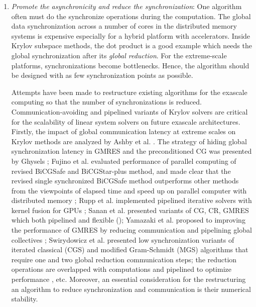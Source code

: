 {\begin{enumerate}[label=(\arabic*)]
    \item \textit{Promote the asynchronicity and reduce the synchronization}: One algorithm often must do the synchronize operations during the computation. The global data synchronization across a number of cores in the distributed memory systems is expensive especially for a hybrid platform with accelerators. Inside Krylov subspace methods, the dot product is a good example which needs the global synchronization after its \textit{global reduction}. For the extreme-scale platforms, synchronizations become bottlenecks. Hence, the algorithm should be designed with as few synchronization points as possible.
	
    Attempts have been made to restructure existing algorithms for the exascale computing so that the number of synchronizations is reduced. Communication-avoiding and pipelined variants of Krylov solvers are critical for the scalability of linear system solvers on future exascale architectures. Firstly, the impact of global communication latency at extreme scales on Krylov methods are analyzed by Ashby et al. \cite{ashby2012impact}. The strategy of hiding global synchronization latency in GMRES and the preconditioned CG was presented by Ghysels \cite{ghysels2013hiding,ghysels2014hiding}; Fujino et al. evaluated performance of parallel computing of revised BiCGSafe and BiCGStar-plus method, and made clear that the revised single synchronized BiCGSafe method outperforms other methods from the viewpoints of elapsed time and speed up on parallel computer with distributed memory \cite{fujino2015estimation}; Rupp et al. implemented pipelined iterative solvers with kernel fusion for GPUs \cite{rupp2016pipelined}; Sanan et al. presented variants of CG, CR, GMRES which both pipelined and flexible (\cite{sanan2016pipelined}); Yamazaki et al. proposed to improving the performance of GMRES by reducing communication and pipelining global collectives \cite{yamazaki2017improving}; Swirydowicz et al. presented low synchronization variants of iterated classical (CGS) and modified Gram-Schmidt (MGS) algorithms that require one and two global reduction communication steps; the reduction operations are overlapped with computations and pipelined to optimize performance \cite{swirydowicz2018low}, etc. Moreover, an essential consideration for the restructuring an algorithm to reduce synchronization and communication is their numerical stability.
	

\end{enumerate}}
